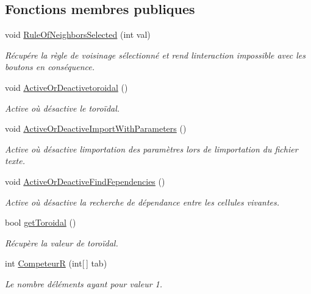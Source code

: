 \subsection*{Fonctions membres publiques}
\begin{DoxyCompactItemize}
\item 
void \mbox{\hyperlink{class_parameters_af47f2d06943667d50ffbc35743ad522c}{Rule\+Of\+Neighbors\+Selected}} (int val)
\begin{DoxyCompactList}\small\item\em Récupére la règle de voisinage sélectionné et rend l\textquotesingle{}interaction impossible avec les boutons en conséquence. \end{DoxyCompactList}\item 
void \mbox{\hyperlink{class_parameters_aed80d6c22fb47d55466f2feff304c87b}{Active\+Or\+Deactivetoroidal}} ()
\begin{DoxyCompactList}\small\item\em Active où désactive le toroïdal. \end{DoxyCompactList}\item 
void \mbox{\hyperlink{class_parameters_a4566221c7993c122d2d32682530f1083}{Active\+Or\+Deactive\+Import\+With\+Parameters}} ()
\begin{DoxyCompactList}\small\item\em Active où désactive l\textquotesingle{}importation des paramètres lors de l\textquotesingle{}importation du fichier texte. \end{DoxyCompactList}\item 
void \mbox{\hyperlink{class_parameters_a23cd831787b627f7ec96da88a774838d}{Active\+Or\+Deactive\+Find\+Fependencies}} ()
\begin{DoxyCompactList}\small\item\em Active où désactive la recherche de dépendance entre les cellules vivantes. \end{DoxyCompactList}\item 
bool \mbox{\hyperlink{class_parameters_aa6714e2b56d3511340476f682a51e677}{get\+Toroidal}} ()
\begin{DoxyCompactList}\small\item\em Récupère la valeur de toroïdal. \end{DoxyCompactList}\item 
int \mbox{\hyperlink{class_parameters_a9eb50f6a67cb480f303e5d6f91997f7d}{CompeteurR}} (int\mbox{[}$\,$\mbox{]} tab)
\begin{DoxyCompactList}\small\item\em Le nombre d\textquotesingle{}éléments ayant pour valeur 1. \end{DoxyCompactList}\item 

\end{DoxyCompactItemize}
